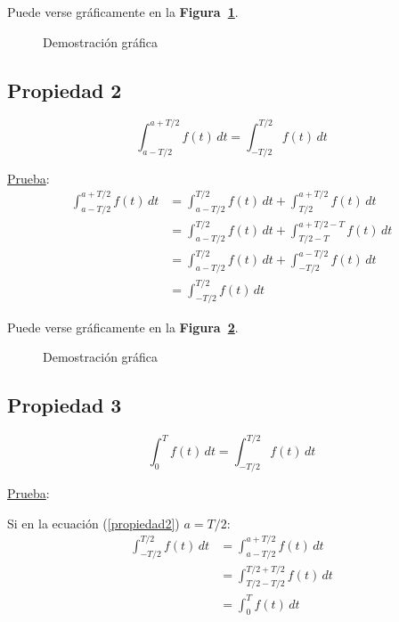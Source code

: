 Puede verse gráficamente en la \textbf{Figura~\ref{figura_02}}.
\begin{figure}[H]
    \centering
    
    \caption{Demostración gráfica}\label{figura_02}
\end{figure}

\subsection*{Propiedad 2}
\begin{equation}
    \int_{a-T/2}^{a+T/2}f(t)\,dt=\int_{-T/2}^{T/2}f(t)\,dt
\label{propiedad2}
\end{equation}

\underline{Prueba}:
\begin{equation*}
\begin{split}
    \int_{a-T/2}^{a+T/2}f(t)\,dt
        &=\int_{a-T/2}^{T/2}f(t)\,dt+\int_{T/2}^{a+T/2}f(t)\,dt\\
        &=\int_{a-T/2}^{T/2}f(t)\,dt+\int_{T/2-T}^{a+T/2-T}f(t)\,dt\\
        &=\int_{a-T/2}^{T/2}f(t)\,dt+\int_{-T/2}^{a-T/2}f(t)\,dt\\
        &=\int_{-T/2}^{T/2}f(t)\,dt
\end{split}
\end{equation*}

Puede verse gráficamente en la \textbf{Figura~\ref{figura_03}}.
\begin{figure}[H]
    \centering
    
    \caption{Demostración gráfica}\label{figura_03}
\end{figure}

\subsection*{Propiedad 3}
\begin{equation}
    \int_{0}^{T}f(t)\,dt=\int_{-T/2}^{T/2}f(t)\,dt
\label{propiedad3}
\end{equation}

\underline{Prueba}:

Si en la ecuación (\ref{propiedad2}) $a=T/2$:
\begin{equation*}
\begin{split}
    \int_{-T/2}^{T/2}f(t)\,dt
        &=\int_{a-T/2}^{a+T/2}f(t)\,dt\\
        &=\int_{T/2-T/2}^{T/2+T/2}f(t)\,dt\\
        &=\int_{0}^{T}f(t)\,dt
\end{split}
\end{equation*}

